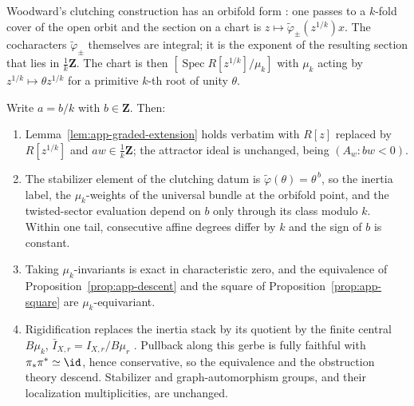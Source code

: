 Woodward's clutching construction has an orbifold form
\cite[Definition~9.7]{WoodwardQKIII}: one passes to a \(k\)-fold cover of the
open orbit and the section on a chart is
\(z\mapsto\widetilde\varphi_\pm(z^{1/k})x\).  The cocharacters
\(\widetilde\varphi_\pm\) themselves are integral; it is the exponent of the
resulting section that lies in \(\tfrac1k\mathbf Z\).  The chart is then
\([\operatorname{Spec}R[z^{1/k}]/\mu_k]\) with \(\mu_k\) acting by
\(z^{1/k}\mapsto\theta z^{1/k}\) for a primitive \(k\)-th root of unity
\(\theta\).

\begin{proposition}
\label{prop:app-mu-k}
Write \(a=b/k\) with \(b\in\mathbf Z\).  Then:
\begin{enumerate}[label=\textup{(\alph*)}]
\item Lemma~\ref{lem:app-graded-extension} holds verbatim with \(R[z]\)
replaced by \(R[z^{1/k}]\) and \(aw\in\tfrac1k\mathbf Z\); the attractor ideal
is unchanged, being \((A_w:bw<0)\).
\item The stabilizer element of the clutching datum is
\(\widetilde\varphi(\theta)=\theta^{\,b}\), so the inertia label, the
\(\mu_k\)-weights of the universal bundle at the orbifold point, and the
twisted-sector evaluation depend on \(b\) only through its class modulo \(k\).
Within one tail, consecutive affine degrees differ by \(k\) and the sign of
\(b\) is constant.
\item Taking \(\mu_k\)-invariants is exact in characteristic zero, and the
equivalence of Proposition~\ref{prop:app-descent} and the square of
Proposition~\ref{prop:app-square} are \(\mu_k\)-equivariant.
\item Rigidification replaces the inertia stack by its quotient by the finite
central \(B\mu_k\), \(\bar I_{X,r}=I_{X,r}/B\mu_r\)
\cite[Section~4.3, Example~4.3(f),(g)]{WoodwardQKII}.  Pullback along this
gerbe is fully faithful with \(\pi_*\pi^*\simeq\id\), hence conservative, so
the equivalence and the obstruction theory descend.  Stabilizer and
graph-automorphism groups, and their localization multiplicities, are
unchanged.
\end{enumerate}
\end{proposition}

